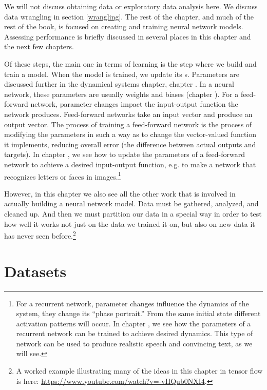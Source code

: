 We will not discuss obtaining data or exploratory data analysis here. We discuss data wrangling in section \ref{wrangling}. The rest of the chapter, and much of the rest of the book, is focused on creating and training neural network models. Assessing performance is briefly discussed in several places in this chapter and the next few chapters.

Of these steps, the main one in terms of learning is the step where we build and train a model. When the model is trained, we update its s. Parameters are discussed further in the dynamical systems chapter, chapter . In a neural network, these parameters are usually weights and biases (chapter ). For a feed-forward network, parameter changes impact the input-output function the network produces. Feed-forward networks take an input vector and produce an output vector. The process of training a feed-forward network is the process of modifying the parameters in such  a way as to change the vector-valued function it implements, reducing overall error (the difference between actual outputs and targets). In chapter , we see how to update the parameters of a feed-forward network to achieve a desired input-output function, e.g. to make a network that recognizes letters or faces in images.\footnote{For a recurrent network, parameter changes influence the dynamics of the system, they change its ``phase portrait.'' From the same initial state different activation patterns will occur. In chapter , we see how the parameters of a recurrent network can be trained to achieve desired dynamics. This type of network can be used to produce realistic speech and convincing text, as we will see.}

However, in this chapter we also see all the other work that is involved in actually building a neural network model. Data must be gathered, analyzed, and cleaned up. And then we must partition our data in a special way in order to test how well it works not just on the data we trained it on, but also on new data it has never seen before.\footnote{A worked example illustrating many of the ideas in this chapter in tensor flow is here: \url{https://www.youtube.com/watch?v=-vHQub0NXI4}.}

\section{Datasets}

